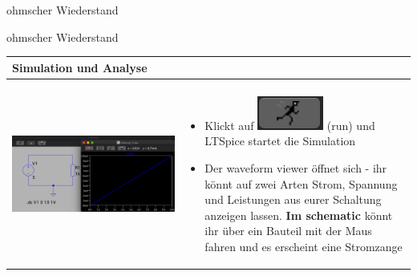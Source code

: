 \begin{frame}[t]{ohmscher Wiederstand}
\begin{spacing}{0.9}
\begin{tiny}
\begin{table}[h!]
    \end{table}
    
    \end{tiny} \end{spacing}
    
     \end{frame}
    
     \begin{frame}[t]{ohmscher Wiederstand}
    
      \begin{spacing}{0.9} \begin{tiny}
      \begin{table}[h!]
        \begin{tabular}{p{5cm} p{5cm}}
          \hline
          \textbf{Simulation und Analyse} & \\
          \hline \\
          \begin{minipage}{.5\textwidth}
            \includegraphics[width=\linewidth]{pictures/analysis.png}
          \end{minipage} 
          & 
          \begin{minipage}{.5\textwidth}
          \begin{itemize}
            \item Klickt auf \includegraphics[scale=0.3]{pictures/run.png} (run) und LTSpice startet die Simulation
            \item Der waveform viewer öffnet sich - ihr könnt auf zwei Arten Strom, Spannung und Leistungen aus eurer Schaltung anzeigen lassen. \newline\newline
            \textbf{Im schematic} könnt ihr über ein Bauteil mit der Maus fahren und es erscheint eine Stromzange\newline\newline

\end{itemize}
\end{minipage}
\end{tabular}
\end{table}
\end{tiny}
\end{spacing}
\end{frame}
